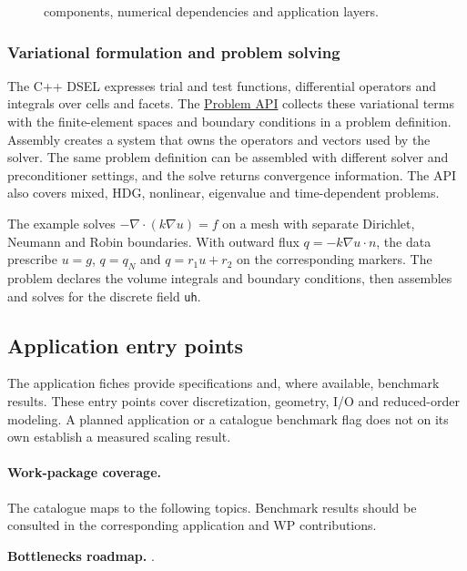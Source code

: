 \begin{figure}[!p]
  \centering
  \resizebox{\linewidth}{!}{}
  \caption{\Feelpp components, numerical dependencies and application layers.}
  \label{fig:Feelpp:components}
\end{figure}

\subsubsection{Variational formulation and problem solving}
\label{sec:Feelpp:problem-api}
The C++ DSEL expresses trial and test functions, differential operators and
integrals over cells and facets. The
\href{https://github.com/feelpp/feelpp/issues/2486}{Problem API}
collects these variational terms with the finite-element spaces and boundary
conditions in a problem definition. Assembly creates a system that owns the
operators and vectors used by the solver. The same problem definition can
be assembled with different solver and preconditioner settings, and the
solve returns convergence information. The API also covers mixed, HDG,
nonlinear, eigenvalue and time-dependent problems.

The example solves $-\nabla\cdot(k\nabla u)=f$ on a mesh with separate
Dirichlet, Neumann and Robin boundaries. With outward flux
$q=-k\nabla u\cdot n$, the data prescribe $u=g$, $q=q_N$ and
$q=r_1u+r_2$ on the corresponding markers. The problem declares the
volume integrals and boundary conditions, then assembles and solves for
the discrete field \texttt{uh}.


\clearpage
\subsection{Application entry points}
\label{sec:Feelpp:apps}
The application fiches provide specifications and, where available, benchmark
results. These entry points cover discretization, geometry, I/O and
reduced-order modeling. A planned application or a catalogue benchmark flag
does not on its own establish a measured scaling result.


\paragraph{Work-package coverage.}
The catalogue maps \Feelpp to the following topics. Benchmark results should be
consulted in the corresponding application and WP contributions.
\begin{FicheMetadataTable}
  \FrameworkWorkPackageRows
\end{FicheMetadataTable}
\noindent\textbf{Bottlenecks roadmap.} \FrameworkBottlenecks.

